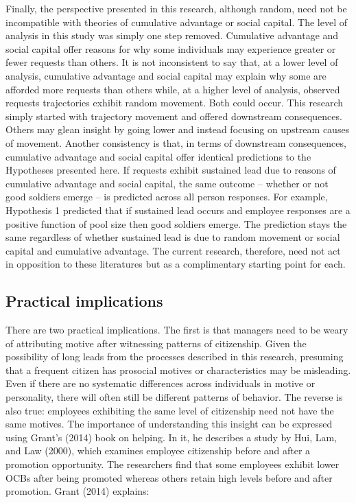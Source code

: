 \documentclass[english,,man]{apa6}
\begin{document}
Finally, the perspective presented in this research, although random, need not be incompatible with theories of cumulative advantage or social capital. The level of analysis in this study was simply one step removed. Cumulative advantage and social capital offer reasons for why some individuals may experience greater or fewer requests than others. It is not inconsistent to say that, at a lower level of analysis, cumulative advantage and social capital may explain why some are afforded more requests than others while, at a higher level of analysis, observed requests trajectories exhibit random movement. Both could occur. This research simply started with trajectory movement and offered downstream consequences. Others may glean insight by going lower and instead focusing on upstream causes of movement. Another consistency is that, in terms of downstream consequences, cumulative advantage and social capital offer identical predictions to the Hypotheses presented here. If requests exhibit sustained lead due to reasons of cumulative advantage and social capital, the same outcome -- whether or not good soldiers emerge -- is predicted across all person responses. For example, Hypothesis 1 predicted that if sustained lead occurs and employee responses are a positive function of pool size then good soldiers emerge. The prediction stays the same regardless of whether sustained lead is due to random movement or social capital and cumulative advantage. The current research, therefore, need not act in opposition to these literatures but as a complimentary starting point for each.

\hypertarget{practical-implications}{%
\subsection{Practical implications}\label{practical-implications}}

There are two practical implications. The first is that managers need to be weary of attributing motive after witnessing patterns of citizenship. Given the possibility of long leads from the processes described in this research, presuming that a frequent citizen has prosocial motives or characteristics may be misleading. Even if there are no systematic differences across individuals in motive or personality, there will often still be different patterns of behavior. The reverse is also true: employees exhibiting the same level of citizenship need not have the same motives. The importance of understanding this insight can be expressed using Grant's (2014) book on helping. In it, he describes a study by Hui, Lam, and Law (2000), which examines employee citizenship before and after a promotion opportunity. The researchers find that some employees exhibit lower OCBs after being promoted whereas others retain high levels before and after promotion. Grant (2014) explains:
\end{document}
